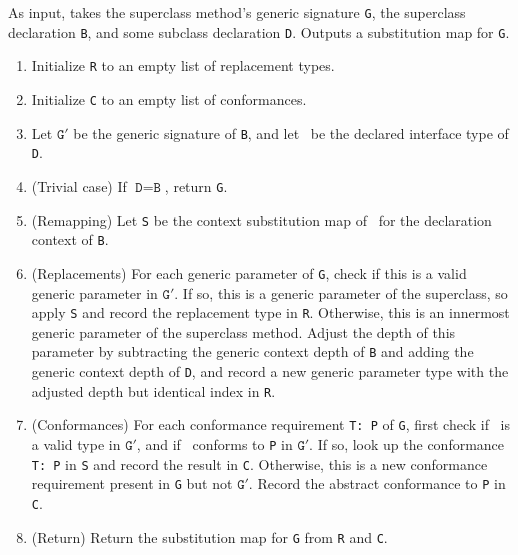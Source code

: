 \documentclass[../generics]{subfiles}
\begin{document}
\begin{algorithm}\label{superclass attaching map} As input, takes the superclass method's generic signature \texttt{G}, the superclass declaration \texttt{B}, and some subclass declaration \texttt{D}. Outputs a substitution map for \texttt{G}.
\begin{enumerate}
\item Initialize \texttt{R} to an empty list of replacement types.
\item Initialize \texttt{C} to an empty list of conformances.
\item Let $\texttt{G}'$ be the generic signature of \texttt{B}, and let \tT\ be the declared interface type of \texttt{D}.
\item (Trivial case) If $\texttt{D}=\texttt{B}$, return \texttt{G}.
\item (Remapping) Let \texttt{S} be the context substitution map of \tT\ for the declaration context of \texttt{B}.
\item (Replacements) For each generic parameter of \texttt{G}, check if this is a valid generic parameter in $\texttt{G}'$. If so, this is a generic parameter of the superclass, so apply \texttt{S} and record the replacement type in \texttt{R}. Otherwise, this is an innermost generic parameter of the superclass method. Adjust the depth of this parameter by subtracting the generic context depth of \texttt{B} and adding the generic context depth of \texttt{D}, and record a new generic parameter type with the adjusted depth but identical index in \texttt{R}.

\item (Conformances) For each conformance requirement \texttt{T:\ P} of \texttt{G}, first check if \tT\ is a valid type in $\texttt{G}'$, and if \tT\ conforms to \texttt{P} in $\texttt{G}'$. If so, look up the conformance \texttt{T:\ P} in \texttt{S} and record the result in \texttt{C}. Otherwise, this is a new conformance requirement present in \texttt{G} but not $\texttt{G}'$. Record the abstract conformance to \texttt{P} in \texttt{C}.

\item (Return) Return the substitution map for \texttt{G} from \texttt{R} and \texttt{C}.
\end{enumerate}
\end{algorithm}
\end{document}
